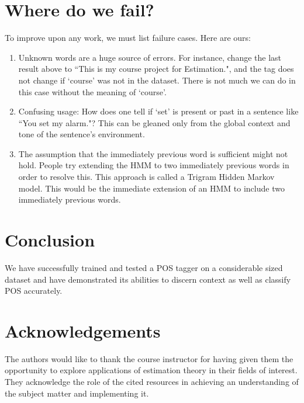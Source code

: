 \documentclass[11pt]{article}
\begin{document}
\section{Where do we fail?}
To improve upon any work, we must list failure cases. Here are ours:
\begin{enumerate}
\item Unknown words are a huge source of errors. For instance, change the last result above to ``This is my course project for Estimation.", and the tag does not change if `course' was not in the dataset. There is not much we can do in this case without the meaning of `course'.
\item Confusing usage: How does one tell if `set' is present or past in a sentence like ``You set my alarm."? This can be gleaned only from the global context and tone of the sentence's environment.
\item The assumption that the immediately previous word is sufficient might not hold. People try extending the HMM to two immediately previous words in order to resolve this. This approach is called a Trigram Hidden Markov model. This would be the immediate extension of an HMM to include two immediately previous words.
\end{enumerate}

\section{Conclusion}
We have successfully trained and tested a POS tagger on a considerable sized dataset and have demonstrated its abilities to discern context as well as classify POS accurately. %

\section{Acknowledgements}
The authors would like to thank the course instructor for having given them the opportunity to explore applications of estimation theory in their fields of interest. They acknowledge the role of the cited resources in achieving an understanding of the subject matter and implementing it.



\end{document}
